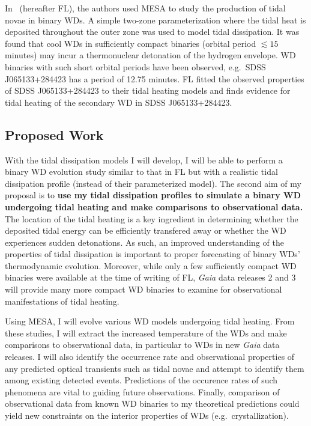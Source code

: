 \documentclass[12pt,
        usenames, %
        dvipsnames %
    ]{article}
\begin{document}
In~\cite{tidal_novae} (hereafter FL), the authors used MESA\cite{MESA} to study
the production of tidal novae in binary WDs. A simple two-zone parameterization
where the tidal heat is deposited throughout the outer zone was used to model
tidal dissipation. It was found that cool WDs in sufficiently compact binaries
(orbital period $\lesssim 15$ minutes) may incur a thermonuclear detonation of
the hydrogen envelope. WD binaries with such short orbital periods have been
observed, e.g.\ SDSS J065133+284423 has a period of 12.75 minutes\cite{12min}.
FL fitted the observed properties of SDSS J065133+284423 to their tidal heating
models and finds evidence for tidal heating of the secondary WD in SDSS
J065133+284423.

\subsection{Proposed Work}

With the tidal dissipation models I will develop, I will be able to perform a
binary WD evolution study similar to that in FL but with a realistic tidal
dissipation profile (instead of their parameterized model). The second aim of my
proposal is to \textbf{use my tidal dissipation profiles to simulate a binary WD
undergoing tidal heating and make comparisons to observational data.} The
location of the tidal heating is a key ingredient in determining whether
the deposited tidal energy can be efficiently transfered away or whether the WD
experiences sudden detonations. As such, an improved understanding of the
properties of tidal dissipation is important to proper forecasting of binary
WDs' thermodynamic evolution. Moreover, while only a few sufficiently compact WD
binaries were available at the time of writing of FL, \emph{Gaia} data releases
2 and 3 will provide many more compact WD binaries to examine for observational
manifestations of tidal heating.

Using MESA, I will evolve various WD models undergoing tidal heating. From these
studies, I will extract the increased temperature of the WDs and make
comparisons to observational data, in particular to WDs in new \emph{Gaia} data
releases. I will also identify the occurrence rate and observational properties
of any predicted optical transients such as tidal novae and attempt to identify
them among existing detected events. Predictions of the occurence rates of such
phenomena are vital to guiding future observations. Finally, comparison of
observational data from known WD binaries to my theoretical predictions could
yield new constraints on the interior properties of WDs (e.g.\ crystallization).
\end{document}
